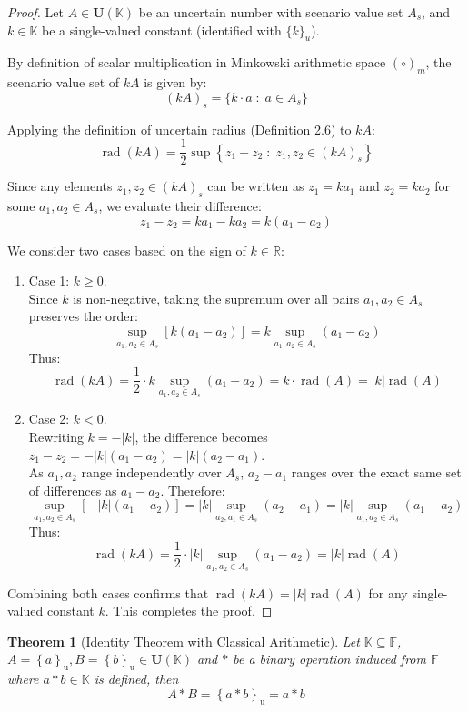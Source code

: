 \documentclass[a4paper,12pt,twoside]{memoir}
\newtheorem{theorem}{Theorem}[chapter]
\DeclareMathOperator{\rad}{rad}
\newcommand{\set}[1]{\left\{#1\right\}} %
\newcommand{\s}[1]{\set{#1}_\mathrm{u}} %
\newcommand{\tsbd}[1]{\mathbf{U}(\mathbb{#1})}
\begin{document}
	\begin{proof}
		Let $A \in \tsbd{K}$ be an uncertain number with scenario value set $A_s$, and $k \in \mathbb{K}$ be a single-valued constant (identified with $\{k\}_u$).
		
		By definition of scalar multiplication in Minkowski arithmetic space $(\circ)_m$, the scenario value set of $k A$ is given by:
		\[
		(k A)_s = \{k \cdot a \;:\; a \in A_s\}
		\]
		
		Applying the definition of uncertain radius (Definition 2.6) to $k A$:
		\[
		\rad(k A) = \frac{1}{2} \sup \set{z_1 - z_2 \;:\; z_1, z_2 \in (k A)_s}
		\]
		
		Since any elements $z_1, z_2 \in (k A)_s$ can be written as $z_1 = k a_1$ and $z_2 = k a_2$ for some $a_1, a_2 \in A_s$, we evaluate their difference:
		\[
		z_1 - z_2 = k a_1 - k a_2 = k(a_1 - a_2)
		\]
		
		We consider two cases based on the sign of $k \in \mathbb{R}$:
		\begin{enumerate}[leftmargin=*]
			\item Case 1: $k \ge 0$. \\
			Since $k$ is non-negative, taking the supremum over all pairs $a_1, a_2 \in A_s$ preserves the order:
			\[
			\sup_{a_1, a_2 \in A_s} [k(a_1 - a_2)] = k \sup_{a_1, a_2 \in A_s} (a_1 - a_2)
			\]
			Thus:
			\[
			\rad(k A) = \frac{1}{2} \cdot k \sup_{a_1, a_2 \in A_s} (a_1 - a_2) = k \cdot \rad(A) = |k| \rad(A)
			\]
			
			\item Case 2: $k < 0$. \\
			Rewriting $k = -|k|$, the difference becomes $z_1 - z_2 = -|k|(a_1 - a_2) = |k|(a_2 - a_1)$. \\
			As $a_1, a_2$ range independently over $A_s$, $a_2 - a_1$ ranges over the exact same set of differences as $a_1 - a_2$. Therefore:
			\[
			\sup_{a_1, a_2 \in A_s} [-|k|(a_1 - a_2)] = |k| \sup_{a_2, a_1 \in A_s} (a_2 - a_1) = |k| \sup_{a_1, a_2 \in A_s} (a_1 - a_2)
			\]
			Thus:
			\[
			\rad(k A) = \frac{1}{2} \cdot |k| \sup_{a_1, a_2 \in A_s} (a_1 - a_2) = |k| \rad(A)
			\]
		\end{enumerate}
		
		Combining both cases confirms that $\rad(k A) = |k| \rad(A)$ for any single-valued constant $k$. This completes the proof.
	\end{proof}
	\begin{theorem}[Identity Theorem with Classical Arithmetic]
		Let $\mathbb{K} \subseteq \mathbb{F}$, $A = \s{a} , B = \s{b} \in \tsbd{K}$ and $*$ be a binary operation induced from $\mathbb{F}$ where $a*b \in \mathbb{K}$ is defined, then
		$$A * B = \s{a*b} = a*b$$
	\end{theorem}
\end{document}

